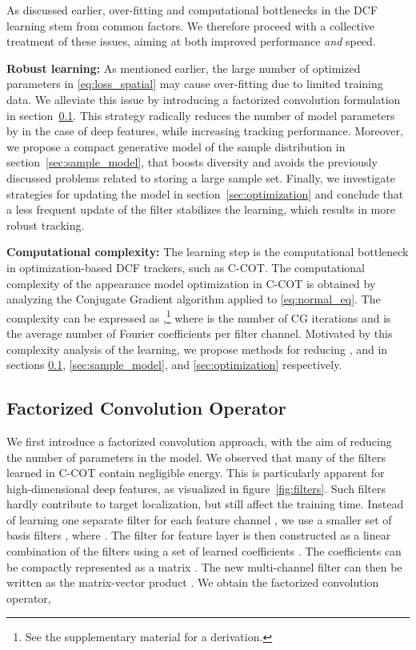 \documentclass[10pt,twocolumn,letterpaper]{article}
\newcommand{\parsection}[1]{\noindent\textbf{#1:}}
\begin{document}
As discussed earlier, over-fitting and computational bottlenecks in the DCF learning stem from common factors. We therefore proceed with a collective treatment of these issues, aiming at both improved performance \emph{and} speed. 

\parsection{Robust learning}
As mentioned earlier, the large number of optimized parameters in \eqref{eq:loss_spatial} may cause over-fitting due to limited training data. We alleviate this issue by introducing a factorized convolution formulation in section~\ref{sec:fac}. This strategy radically reduces the number of model parameters by  in the case of deep features, while increasing tracking performance. Moreover, we propose a compact generative model of the sample distribution in section~\ref{sec:sample_model}, that boosts diversity and avoids the previously discussed problems related to storing a large sample set. Finally, we investigate strategies for updating the model in section~\ref{sec:optimization} and conclude that a less frequent update of the filter stabilizes the learning, which results in more robust tracking.

\parsection{Computational complexity}
The learning step is the computational bottleneck in optimization-based DCF trackers, such as C-COT. The computational complexity of the appearance model optimization in C-COT is obtained by analyzing the Conjugate Gradient algorithm applied to \eqref{eq:normal_eq}. The complexity can be expressed as ,\footnote{See the supplementary material for a derivation.} where  is the number of CG iterations and  is the average number of Fourier coefficients per filter channel. Motivated by this complexity analysis of the learning, we propose methods for reducing ,  and  in sections \ref{sec:fac}, \ref{sec:sample_model}, and \ref{sec:optimization} respectively.

\subsection{Factorized Convolution Operator}
\label{sec:fac}

We first introduce a factorized convolution approach, with the aim of reducing the number of parameters in the model. We observed that many of the filters  learned in C-COT contain negligible energy. This is particularly apparent for high-dimensional deep features, as visualized in figure~\ref{fig:filters}. Such filters hardly contribute to target localization, but still affect the training time. Instead of learning one separate filter for each feature channel , we use a smaller set of basis filters , where . The filter for feature layer  is then constructed as a linear combination  of the filters  using a set of learned coefficients . The coefficients can be compactly represented as a  matrix . The new multi-channel filter can then be written as the matrix-vector product . We obtain the factorized convolution operator,
\end{document}
